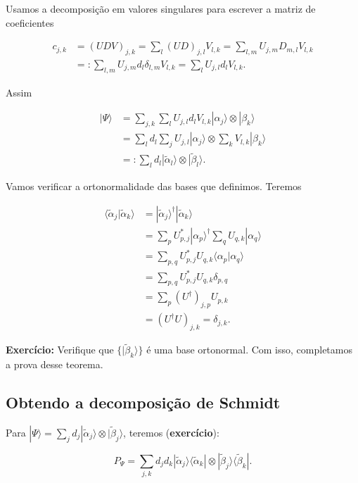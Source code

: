 \documentclass[11pt]{article}
\begin{document}
Usamos a decomposição em valores singulares para escrever a matriz de
coeficientes

\begin{align}
c_{j,k}&=(UDV)_{j,k}=\sum_{l}(UD)_{j,l}V_{l,k}=\sum_{l,m}U_{j,m}D_{m,l}V_{l,k} \\
&=:\sum_{l,m}U_{j,m}d_{l}\delta_{l,m}V_{l,k}=\sum_{l}U_{j,l}d_{l}V_{l,k}.
\end{align}

Assim

\begin{align}
|\Psi\rangle &= \sum_{j,k}\sum_{l}U_{j,l}d_{l}V_{l,k}|\alpha_{j}\rangle\otimes|\beta_{k}\rangle \\
&= \sum_{l}d_{l}\sum_{j}U_{j,l}|\alpha_{j}\rangle\otimes\sum_{k}V_{l,k}|\beta_{k}\rangle \\
& =: \sum_{l}d_{l}|\tilde{\alpha}_{l}\rangle\otimes|\tilde{\beta}_{l}\rangle.
\end{align}

Vamos verificar a ortonormalidade das bases que definimos. Teremos

\begin{align}
\langle\tilde{\alpha}_{j}|\tilde{\alpha}_{k}\rangle & = |\tilde{\alpha}_{j}\rangle^{\dagger}|\tilde{\alpha}_{k}\rangle \\
& = \sum_{p}U_{p,j}^{*}|\alpha_{p}\rangle^{\dagger}\sum_{q}U_{q,k}|\alpha_{q}\rangle \\
& = \sum_{p,q}U_{p,j}^{*}U_{q,k}\langle\alpha_{p}|\alpha_{q}\rangle \\
& = \sum_{p,q}U_{p,j}^{*}U_{q,k}\delta_{p,q} \\
& = \sum_{p}(U^{\dagger})_{j,p}U_{p,k} \\
& = (U^{\dagger}U)_{j,k}=\delta_{j,k}.
\end{align}

\textbf{Exercício:} Verifique que \(\{|\tilde{\beta}_{k}\rangle\}\) é
uma base ortonormal. Com isso, completamos a prova desse teorema.

    \subsection{Obtendo a decomposição de
Schmidt}\label{obtendo-a-decomposiuxe7uxe3o-de-schmidt}

Para
\(|\Psi\rangle = \sum_{j}d_{j}|\tilde{\alpha}_{j}\rangle\otimes|\tilde{\beta}_{j}\rangle\),
teremos (\textbf{exercício}):

\begin{equation}
P_{\Psi}=\sum_{j,k}d_{j}d_{k}|\tilde{\alpha}_{j}\rangle\langle\tilde{\alpha}_{k}|\otimes|\tilde{\beta}_{j}\rangle\langle\tilde{\beta}_{k}|.
\end{equation}
\end{document}
